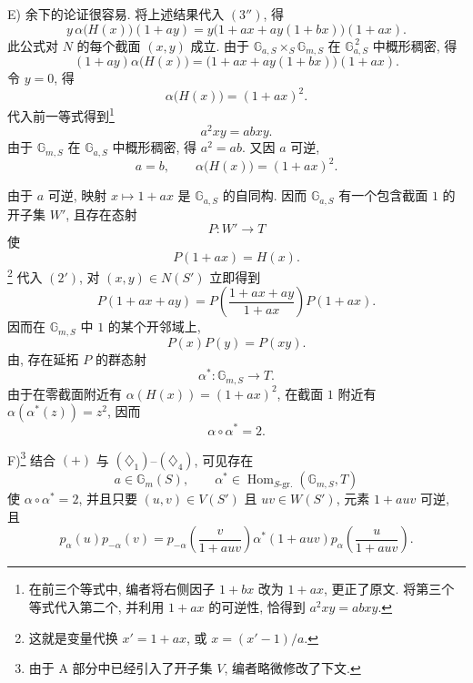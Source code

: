 \textup{E)} 余下的论证很容易. 将上述结果代入 \((3'')\), 得
\[
  y\,\alpha\bigl(H(x)\bigr)(1+ay)
   =y\bigl(1+ax+ay(1+bx)\bigr)(1+ax).
\]
此公式对 \(N\) 的每个截面 \((x,y)\) 成立. 由于 \(\mathbb G_{a,S}\times_S\mathbb G_{m,S}\) 在 \(\mathbb G_{a,S}^{\,2}\) 中概形稠密, 得
\[
  (1+ay)\alpha\bigl(H(x)\bigr)
   =\bigl(1+ax+ay(1+bx)\bigr)(1+ax).
\]
令 \(y=0\), 得
\[
  \alpha\bigl(H(x)\bigr)=(1+ax)^2.
\]
代入前一等式得到\footnote{在前三个等式中, 编者将右侧因子 \(1+bx\) 改为 \(1+ax\), 更正了原文. 将第三个等式代入第二个, 并利用 \(1+ax\) 的可逆性, 恰得到 \(a^2xy=abxy\).}
\[
  a^2xy=abxy.
\]
由于 \(\mathbb G_{m,S}\) 在 \(\mathbb G_{a,S}\) 中概形稠密, 得 \(a^2=ab\). 又因 \(a\) 可逆,
\begin{equation}\tag{\(\diamondsuit_2\)}
  a=b,\qquad \alpha\bigl(H(x)\bigr)=(1+ax)^2.
\end{equation}

由于 \(a\) 可逆, 映射 \(x\mapsto1+ax\) 是 \(\mathbb G_{a,S}\) 的自同构. 因而 \(\mathbb G_{a,S}\) 有一个包含截面 \(1\) 的开子集 \(W'\), 且存在态射
\[
  P\colon W'\longrightarrow T
\]
使
\[
  P(1+ax)=H(x).
\]
\footnote{这就是变量代换 \(x'=1+ax\), 或 \(x=(x'-1)/a\).}
代入 \((2')\), 对 \((x,y)\in N(S')\) 立即得到
\[
  P(1+ax+ay)
   =P\left(\frac{1+ax+ay}{1+ax}\right)P(1+ax).
\]
因而在 \(\mathbb G_{m,S}\) 中 \(1\) 的某个开邻域上,
\[
  P(x)P(y)=P(xy).
\]
由, 存在延拓 \(P\) 的群态射
\begin{equation}\tag{\(\diamondsuit_3\)}
  \alpha^\ast\colon\mathbb G_{m,S}\longrightarrow T.
\end{equation}
由于在零截面附近有 \(\alpha(H(x))=(1+ax)^2\), 在截面 \(1\) 附近有 \(\alpha(\alpha^\ast(z))=z^2\), 因而
\begin{equation}\tag{\(\diamondsuit_4\)}
  \alpha\circ\alpha^\ast=2.
\end{equation}

\textup{F)}\footnote{由于 A 部分中已经引入了开子集 \(V\), 编者略微修改了下文.}
结合 \((+)\) 与 \((\diamondsuit_1)\)--\((\diamondsuit_4)\), 可见存在
\[
  a\in\mathbb G_m(S),\qquad
  \alpha^\ast\in
    \operatorname{Hom}_{S\text{-gr.}}(\mathbb G_{m,S},T)
\]
使 \(\alpha\circ\alpha^\ast=2\), 并且只要 \((u,v)\in V(S')\) 且 \(uv\in W(S')\), 元素 \(1+auv\) 可逆, 且
\[
  p_\alpha(u)p_{-\alpha}(v)
   =p_{-\alpha}\left(\frac{v}{1+auv}\right)
      \alpha^\ast(1+auv)
      p_\alpha\left(\frac{u}{1+auv}\right).
\]

